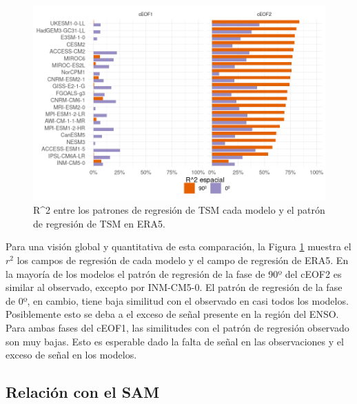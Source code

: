 \documentclass[12pt,oneside,a4paper]{reedthesis}
\begin{document}
\begin{figure}

{\centering \includegraphics{figures/50-cmip6/cor-sst-regr-1} 

}

\caption{R\^{}2 entre los patrones de regresión de TSM cada modelo y el patrón de regresión de TSM en ERA5.}\label{fig:cor-sst-regr}
\end{figure}

Para una visión global y quantitativa de esta comparación, la Figura \ref{fig:cor-sst-regr} muestra el \(r^2\) los campos de regresión de cada modelo y el campo de regresión de ERA5.
En la mayoría de los modelos el patrón de regresión de la fase de 90º del cEOF2 es similar al observado, excepto por INM-CM5-0.
El patrón de regresión de la fase de 0º, en cambio, tiene baja similitud con el observado en casi todos los modelos.
Posiblemente esto se deba a el exceso de señal presente en la región del ENSO.
Para ambas fases del cEOF1, las similitudes con el patrón de regresión observado son muy bajas.
Esto es esperable dado la falta de señal en las observaciones y el exceso de señal en los modelos.

\hypertarget{relaciuxf3n-con-el-sam}{%
\subsection{Relación con el SAM}\label{relaciuxf3n-con-el-sam}}
\end{document}
